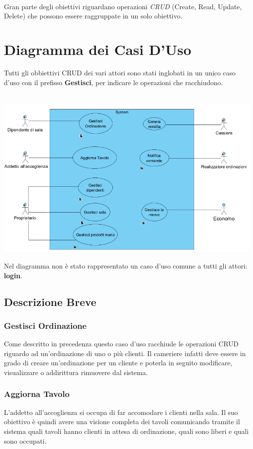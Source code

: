 \\Gran parte degli obiettivi riguardano operazioni \textit{CRUD} (Create, Read, Update, Delete) che possono essere raggruppate in un solo obiettivo.

\newpage
\section{Diagramma dei Casi D'Uso}
Tutti gli obbiettivi CRUD dei vari attori sono stati inglobati in un unico caso d'uso con il prefisso \textbf{Gestisci}, per indicare le operazioni che racchiudono.
\\
\\
\begin{centering}  
	\includegraphics[width=\textwidth]{Immagini/DiagrammaCasiUso.png}
\end{centering}
Nel diagramma non è stato rappresentato un caso d'uso comune a tutti gli attori: \textbf{login}. 
\subsection{Descrizione Breve}
\subsubsection{Gestisci Ordinazione}
Come descritto in precedenza questo caso d'uso racchiude le operazioni CRUD riguardo ad un'ordinazione di uno o più clienti. Il cameriere infatti deve essere in grado di creare un'ordinazione per un cliente e poterla in seguito modificare, visualizzare o addirittura rimuovere dal sistema.

\subsubsection{Aggiorna Tavolo}
L'addetto all'accoglienza si occupa di far accomodare i clienti nella sala. Il suo obiettivo è quindi avere una visione completa dei tavoli comunicando tramite il sistema  quali tavoli hanno clienti in attesa di ordinazione, quali sono liberi e quali sono occupati.

